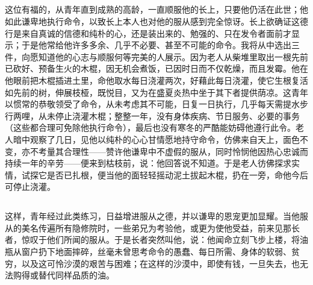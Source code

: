
\subsection{}

\par

这位有福的，从青年直到成熟的高龄，一直顺服他的长上，只要他仍活在此世；他如此谦卑地执行命令，以致长上本人也对他的服从感到完全惊讶。长上欲确证这德行是来自真诚的信德和纯朴的心，还是装出来的、勉强的、只在发令者面前才显示；于是他常给他许多多余、几乎不必要、甚至不可能的命令。我将从中选出三件，向愿知道他的心志与顺服何等完美的人展示。因为老人从柴堆里取出一根先前已砍好、预备生火的木棍，因无机会煮饭，已因时日而不仅乾燥，而且发霉。他在他眼前把木棍插进土里，命他取水每日浇灌两次，好藉此每日浇灌，使它生根复活如先前的树，伸展枝桠，既悦目，又为在盛夏炎热中坐于其下者提供荫凉。这青年以惯常的恭敬领受了命令，从未考虑其不可能，日复一日执行，几乎每天需提水步行两哩，从未停止浇灌木棍；整整一年，没有身体疾病、节日服务、必要的事务（这些都合理可免除他执行命令），最后也没有寒冬的严酷能妨碍他遵行此令。老人暗中观察了几日，见他以纯朴的心心甘情愿地持守命令，仿佛来自天上，面色不变，亦不考量其合理性——赞许他谦卑中不虚假的服从，同时怜悯他因热心忠诚而持续一年的辛劳——便来到枯枝前，说：他回答说不知道。于是老人彷佛探求实情，试探它是否已扎根，便当他的面轻轻摇动泥土拔起木棍，扔在一旁，命他今后可停止浇灌。\par


\subsection{}

\par

这样，青年经过此类练习，日益增进服从之德，并以谦卑的恩宠更加显耀。当他服从的美名传遍所有隐修院时，一些弟兄为考验他，或更为使他受益，前来见那长者，惊叹于他们所闻的服从。于是长者突然叫他，说：他闻命立刻飞步上楼，将油瓶从窗户扔下地面摔碎，丝毫未曾思考命令的愚蠢、每日所需、身体的软弱、贫穷，以及这可怜沙漠的艰苦与困难；在这样的沙漠中，即使有钱，一旦失去，也无法购得或替代同样品质的油。\par

